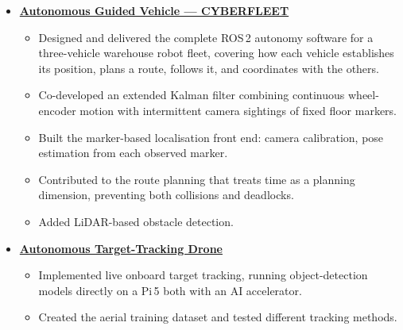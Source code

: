 \documentclass[10pt]{article}
\begin{document}
\begin{itemize}[label={}, leftmargin=0pt, itemsep=5pt]
    \item \textbf{\href{https://www.youtube.com/watch?v=hJlHvlHfOaA}{Autonomous Guided Vehicle ---
    CYBERFLEET}}
    \begin{itemize}
        \item Designed and delivered the complete ROS\,2 autonomy software for a three-vehicle
        warehouse robot fleet, covering how each vehicle establishes its position, plans a route,
        follows it, and coordinates with the others.
        \item Co-developed an extended Kalman filter combining continuous wheel-encoder motion with
        intermittent camera sightings of fixed floor markers.
        \item Built the marker-based localisation front end: camera calibration, pose estimation
        from each observed marker.
        \item Contributed to the route planning that treats time as a planning dimension, preventing both collisions and deadlocks.
        \item Added LiDAR-based obstacle detection.
    \end{itemize}

    \item \textbf{\href{https://www.youtube.com/watch?v=MLrD0SuG4Q0}{Autonomous Target-Tracking
    Drone}}
    \begin{itemize}
        \item Implemented live onboard target tracking, running  object-detection models
        directly on a Pi\,5 both with an AI accelerator. 
        \item Created the aerial training
        dataset and tested different tracking methods.
    \end{itemize}




\end{itemize}
\end{document}
